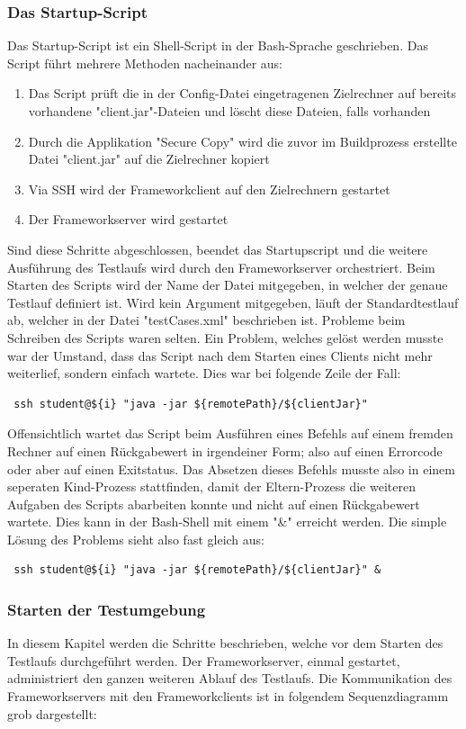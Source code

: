 \subsubsection{Das Startup-Script}
\label{sec:startupScript}
Das  Startup-Script ist ein Shell-Script in der Bash-Sprache geschrieben. Das Script führt mehrere Methoden nacheinander aus:
\begin{enumerate}
\item Das Script prüft die in der Config-Datei eingetragenen Zielrechner auf bereits vorhandene "client.jar"-Dateien und löscht diese Dateien, falls vorhanden
\item Durch die Applikation "Secure Copy" wird die zuvor im Buildprozess erstellte Datei "client.jar" auf die Zielrechner kopiert
\item Via SSH wird der Frameworkclient auf den Zielrechnern gestartet
\item Der Frameworkserver wird gestartet
\end{enumerate}
Sind diese Schritte abgeschlossen, beendet das Startupscript und die weitere Ausführung des Testlaufs wird durch den Frameworkserver orchestriert.
Beim Starten des Scripts wird der Name der Datei mitgegeben, in welcher der genaue Testlauf definiert ist. Wird kein Argument mitgegeben, läuft der Standardtestlauf ab, welcher in der Datei "testCases.xml" beschrieben ist.
Probleme beim Schreiben des Scripts waren selten. Ein Problem, welches gelöst werden musste war der Umstand, dass das Script nach dem Starten eines Clients nicht mehr weiterlief, sondern einfach wartete. Dies war bei folgende Zeile der Fall:
\begin{lstlisting}	
 ssh student@${i} "java -jar ${remotePath}/${clientJar}"
\end{lstlisting}	
Offensichtlich wartet das Script beim Ausführen eines Befehls auf einem fremden Rechner auf einen Rückgabewert in irgendeiner Form; also auf einen Errorcode oder aber auf einen Exitstatus. Das Absetzen dieses Befehls musste also in einem seperaten Kind-Prozess stattfinden, damit der Eltern-Prozess die weiteren Aufgaben des Scripts abarbeiten konnte und nicht auf einen Rückgabewert wartete. Dies kann in der Bash-Shell mit einem "\&" erreicht werden. Die simple Lösung des Problems sieht also fast gleich aus:
\begin{lstlisting}
 ssh student@${i} "java -jar ${remotePath}/${clientJar}" &
\end{lstlisting}

\subsubsection{Starten der Testumgebung}
\label{sec:frameWorkServer}
In diesem Kapitel werden die Schritte beschrieben, welche vor dem Starten des Testlaufs durchgeführt werden. Der Frameworkserver, einmal gestartet, administriert den ganzen weiteren Ablauf des Testlaufs. \newline
Die Kommunikation des Frameworkservers mit den Frameworkclients ist in folgendem Sequenzdiagramm grob dargestellt:

